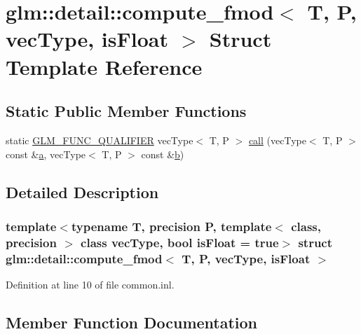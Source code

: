 \hypertarget{structglm_1_1detail_1_1compute__fmod}{}\section{glm\+::detail\+::compute\+\_\+fmod$<$ T, P, vec\+Type, is\+Float $>$ Struct Template Reference}
\label{structglm_1_1detail_1_1compute__fmod}
\subsection*{Static Public Member Functions}
\begin{DoxyCompactItemize}
\item 
static \mbox{\hyperlink{setup_8hpp_a33fdea6f91c5f834105f7415e2a64407}{G\+L\+M\+\_\+\+F\+U\+N\+C\+\_\+\+Q\+U\+A\+L\+I\+F\+I\+ER}} vec\+Type$<$ T, P $>$ \mbox{\hyperlink{structglm_1_1detail_1_1compute__fmod_add2143b71c7bfb64b030b4eed6ea3ef6}{call}} (vec\+Type$<$ T, P $>$ const \&\mbox{\hyperlink{glad_8h_ac8729153468b5dcf13f971b21d84d4e5}{a}}, vec\+Type$<$ T, P $>$ const \&\mbox{\hyperlink{glad_8h_a6eba317e3cf44d6d26c04a5a8f197dcb}{b}})
\end{DoxyCompactItemize}


\subsection{Detailed Description}
\subsubsection*{template$<$typename T, precision P, template$<$ class, precision $>$ class vec\+Type, bool is\+Float = true$>$\newline
struct glm\+::detail\+::compute\+\_\+fmod$<$ T, P, vec\+Type, is\+Float $>$}



Definition at line 10 of file common.\+inl.



\subsection{Member Function Documentation}
\mbox{\label{structglm_1_1detail_1_1compute__fmod_add2143b71c7bfb64b030b4eed6ea3ef6}} 
